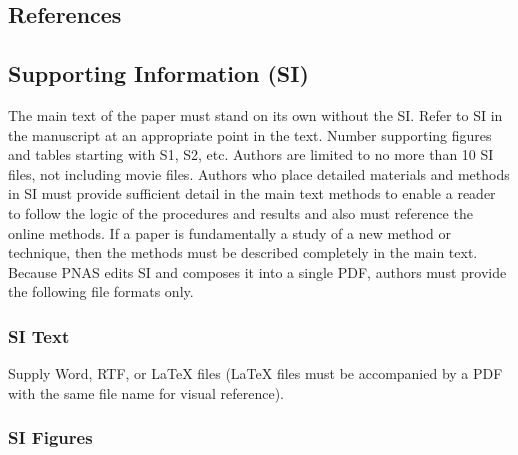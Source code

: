 \documentclass[9pt,twocolumn,twoside]{pnas-new}
\begin{document}

\subsection*{References}



\onecolumn

\subsection*{Supporting Information (SI)}
\FloatBarrier

The main text of the paper must stand on its own without the SI. Refer to SI in the manuscript at an appropriate point in the text. Number supporting figures and tables starting with S1, S2, etc. Authors are limited to no more than 10 SI files, not including movie files. Authors who place detailed materials and methods in SI must provide sufficient detail in the main text methods to enable a reader to follow the logic of the procedures and results and also must reference the online methods. If a paper is fundamentally a study of a new method or technique, then the methods must be described completely in the main text. Because PNAS edits SI and composes it into a single PDF, authors must provide the following file formats only.

\subsubsection*{SI Text}

Supply Word, RTF, or LaTeX files (LaTeX files must be accompanied by a PDF with the same file name for visual reference).

\subsubsection*{SI Figures}
\end{document}
